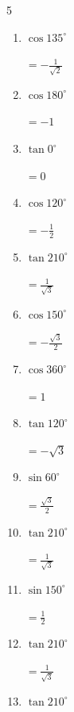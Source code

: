 \begin{multicols}{5}
\begin{enumerate}
        $\displaystyle =0$

  \item $\displaystyle \cos{135^\circ}$

        $\displaystyle =-\frac{1}{\sqrt{2}}$

  \item $\displaystyle \cos{180^\circ}$

        $\displaystyle =-1$

  \item $\displaystyle \tan{0^\circ}$

        $\displaystyle =0$

  \item $\displaystyle \cos{120^\circ}$

        $\displaystyle =-\frac{1}{2}$

  \item $\displaystyle \tan{210^\circ}$

        $\displaystyle =\frac{1}{\sqrt{3}}$

\columnbreak %

  \item $\displaystyle \cos{150^\circ}$

        $\displaystyle =-\frac{\sqrt{3}}{2}$

  \item $\displaystyle \cos{360^\circ}$

        $\displaystyle =1$

  \item $\displaystyle \tan{120^\circ}$

        $\displaystyle =-\sqrt{3}$

  \item $\displaystyle \sin{60^\circ}$

        $\displaystyle =\frac{\sqrt{3}}{2}$

  \item $\displaystyle \tan{210^\circ}$

        $\displaystyle =\frac{1}{\sqrt{3}}$

  \item $\displaystyle \sin{150^\circ}$

        $\displaystyle =\frac{1}{2}$

  \item $\displaystyle \tan{210^\circ}$

        $\displaystyle =\frac{1}{\sqrt{3}}$

  \item $\displaystyle \tan{210^\circ}$


\end{enumerate}
\end{multicols}

